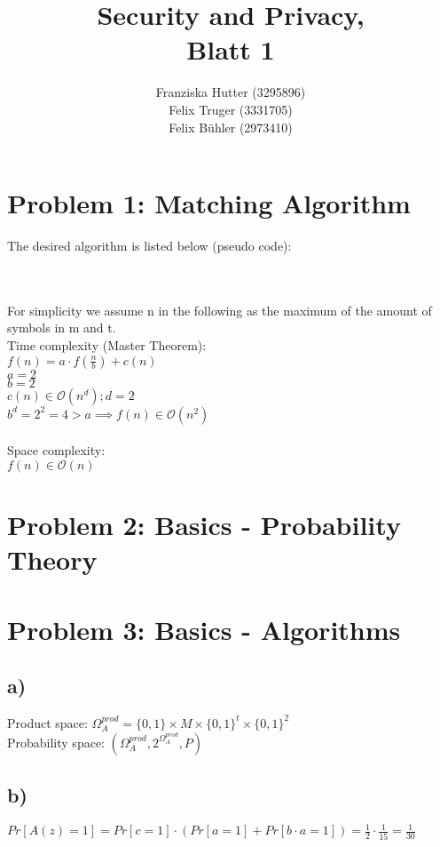 \documentclass[12pt,pdftex,a4paper]{article}
\title{Security and Privacy,\\ Blatt 1}
\author{Franziska Hutter (3295896)\\
	Felix Truger (3331705)\\
	Felix Bühler (2973410)}
\newcommand\tab[1][1cm]{\hspace*{#1}}
\begin{document}
\maketitle
\pagebreak

\section*{Problem 1: Matching Algorithm}

The desired algorithm is listed below (pseudo code):

\ %
\\~\\
For simplicity we assume n in the following as the maximum of the amount of symbols in m and t.\\
Time complexity (Master Theorem):\\
\tab $f(n) = a \cdot f(\frac{n}{b}) + c(n)$\\
\tab $a = 2$\\
\tab $b = 2$\\
\tab $c(n) \in \mathcal{O}(n^d); d = 2$\\
\tab $b^d = 2^2 = 4 > a \implies f(n) \in \mathcal{O}(n^2)$\\~\\

Space complexity:\\
\tab $f(n)\in \mathcal{O}(n)$

\section*{Problem 2: Basics - Probability Theory}

\section*{Problem 3: Basics - Algorithms}

\subsection*{a)} 
Product space: $\Omega_A^{prod} = \{0, 1\} \times M \times \{0, 1\}^t \times \{0, 1\}^2$\\
Probability space: $(\Omega_A^{prod}, 2^{\Omega_A^{prod}}, P)$

\subsection*{b)}
$Pr[A(z) = 1] = Pr[c = 1] \cdot (Pr[a = 1] + Pr[b \cdot a = 1]) = \frac{1}{2} \cdot \frac{1}{15} = \frac{1}{30}$
\end{document}
